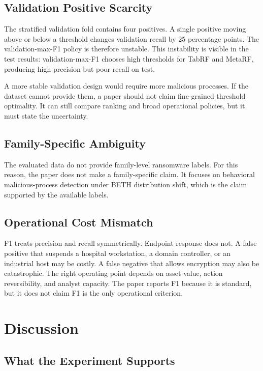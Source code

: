 \documentclass[journal]{IEEEtran}
\begin{document}
\subsection{Validation Positive Scarcity}

The stratified validation fold contains four positives. A single positive moving above or below a threshold changes validation recall by 25 percentage points. The validation-max-F1 policy is therefore unstable. This instability is visible in the test results: validation-max-F1 chooses high thresholds for TabRF and MetaRF, producing high precision but poor recall on test.

A more stable validation design would require more malicious processes. If the dataset cannot provide them, a paper should not claim fine-grained threshold optimality. It can still compare ranking and broad operational policies, but it must state the uncertainty.

\subsection{Family-Specific Ambiguity}

The evaluated data do not provide family-level ransomware labels. For this reason, the paper does not make a family-specific claim. It focuses on behavioral malicious-process detection under BETH distribution shift, which is the claim supported by the available labels.

\subsection{Operational Cost Mismatch}

F1 treats precision and recall symmetrically. Endpoint response does not. A false positive that suspends a hospital workstation, a domain controller, or an industrial host may be costly. A false negative that allows encryption may also be catastrophic. The right operating point depends on asset value, action reversibility, and analyst capacity. The paper reports F1 because it is standard, but it does not claim F1 is the only operational criterion.

\section{Discussion}
\label{sec:discussion}

\subsection{What the Experiment Supports}
\end{document}
